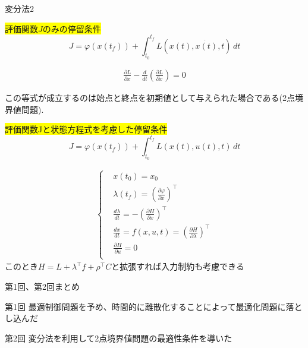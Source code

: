 \documentclass[twocolumn, dvipdfmx,12pt]{beamer}
\begin{document}
    \begin{frame}{変分法2}
        \fontsize{7.8pt}{7.8pt}\selectfont


        \begin{multicols}{2}
            \colorbox{yellow}{評価関数$J$のみの停留条件}\\
                \begin{equation*}
                    J =\varphi(x(t_f))+\int_{t_0}^{t_f} L(x(t), \dot{x(t)}, t) \, dt
                \end{equation*}

                \begin{align*}
                    \frac{\partial L}{\partial x} - \frac{d}{dt} \left( \frac{\partial L}{\partial \dot{x}} \right) = 0
                \end{align*}

                この等式が成立するのは始点と終点を初期値として与えられた場合である(2点境界値問題).
            \columnbreak

            \colorbox{yellow}{評価関数Jと状態方程式を考慮した停留条件}\\
            \begin{equation*}
                J =\varphi(x(t_f))+\int_{t_0}^{t_f} L(x(t), u(t), t) \, dt
            \end{equation*}

            \begin{align*}
                \begin{cases}
                    &x(t_0)=x_0 \\
                    &\lambda(t_f)=\left(\frac{\partial \varphi}{\partial x}\right)^\top \\
                    &\frac{d\lambda}{dt}=-\left(\frac{\partial H}{\partial x}\right)^\top\\
                    &\frac{dx}{dt}=f(x,u,t)=\left(\frac{\partial H}{\partial \lambda}\right)^\top \\
                    &\frac{\partial H}{\partial u}=0 \\
                \end{cases}
            \end{align*}
                このとき$H=L+\lambda ^\top f + \rho ^\top C$と拡張すれば入力制約も考慮できる
        \end{multicols}
                 
    \end{frame}

    \begin{frame}{第1回、第2回まとめ}
        \begin{itembox}[l]{第1回}
            最適制御問題を予め、時間的に離散化することによって最適化問題に落とし込んだ
        \end{itembox}
        \begin{itembox}[l]{第2回}
            変分法を利用して2点境界値問題の最適性条件を導いた
        \end{itembox}
    \end{frame}
\end{document}
